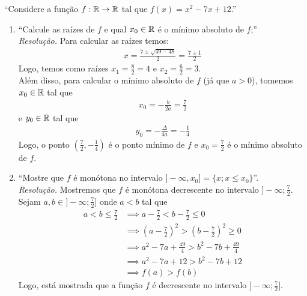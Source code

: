 \enquote{Considere a função $f: \mathbb R \rightarrow \mathbb R$ tal que $f(x) = x^2 -7x + 12$.}
\begin{enumerate}
    \item \enquote{Calcule as raízes de $f$ e qual $x_0 \in \mathbb R$ é o mínimo absoluto de $f$;} \\
    \emph{Resolução.} Para calcular as raízes temos:
    \begin{align*}
        x = \frac{7 \pm \sqrt{49 - 48}}{2} = \frac{7 \pm 1}{2}
    \end{align*}
    Logo, temos como raízes $x_1 = \frac{8}{2} = 4$ e $x_2 = \frac{6}{2} = 3$. \\
    Além disso, para calcular o mínimo absoluto de $f$ (já que $a > 0$), tomemos $x_0 \in \mathbb R$ tal que
    \begin{align*}
        x_0 = -\frac{b}{2a} = \frac{7}{2}
    \end{align*}
    e $y_0 \in \mathbb R$ tal que
    \begin{align*}
        y_0 = -\frac{\Delta}{4a} = -\frac{1}{4}
    \end{align*}
    Logo, o ponto $(\frac{7}{2}, -\frac{1}{4})$ é o ponto mínimo de $f$ e $x_0 = \frac{7}{2}$ é o mínimo absoluto de $f$.
    \item \enquote{Mostre que $f$ é monótona no intervalo $]-\infty, x_0] = \{x; x \le x_0\}$}. \\
    \emph{Resolução.} Mostremos que $f$ é monótona decrescente no intervalo $]-\infty; \frac{7}{2}$. Sejam $a, b \in ]-\infty; \frac{7}{2}]$ onde $a < b$ tal que
    \begin{align*}
        a < b \le \frac{7}{2} & \implies a - \frac{7}{2} < b - \frac{7}{2} \le 0 \\ & \implies
        (a - \frac{7}{2})^2 > (b - \frac{7}{2})^2 \ge 0 \\ & \implies
        a^2 - 7a + \frac{49}{4} > b^2 - 7b + \frac{49}{4} \\ & \implies
        a^2 - 7a + 12 > b^2 - 7b + 12 \\ & \implies
        f(a) > f(b)
    \end{align*}
    Logo, está mostrada que a função $f$ é decrescente no intervalo $]-\infty; \frac{7}{2}]$.
\end{enumerate}